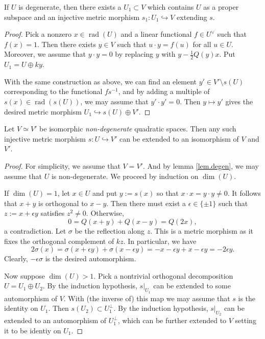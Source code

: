 \documentclass{article}
\newcommand{\rad}{\operatorname{rad}}
\begin{document}
\begin{lemma}\label{lem.degen}
    If $U$ is degenerate, then there exists a $U_1\subset V$ which contains $U$ as a proper subspace and an injective metric morphism $s_1:U_1\hookrightarrow V$ extending $s$.
\end{lemma}

\begin{proof}
    Pick a nonzero $x\in \rad(U)$ and a linear functional $f\in U^\vee$ such that $f(x)=1$. Then there exists $y\in V$ such that $u\cdot y=f(u)$ for all $u\in U$. Moreover, we assume that $y\cdot y=0$ by replacing $y$ with $y-\frac{1}{2}Q(y)x$. Put $U_1=U\oplus ky$.

    With the same construction as above, we can find an element $y'\in V'\setminus s(U)$ corresponding to the functional $fs^{-1}$, and by adding a multiple of $s(x)\in\rad(s(U))$, we may assume that $y'\cdot y'=0$. Then $y\mapsto y'$ gives the desired metric morphism $U_1\hookrightarrow s(U)\oplus V'$.
\end{proof}

\begin{theorem}[Witt]
    Let $V\simeq V'$ be isomorphic \emph{non-degenerate} quadratic spaces. Then any such injective metric morphism $s:U\hookrightarrow V'$ can be extended to an isomorphism of $V$ and $V'$.
\end{theorem}

\begin{proof}
    For simplicity, we assume that $V=V'$. And by lemma \ref{lem.degen}, we may assume that $U$ is non-degenerate. We proceed by induction on $\dim(U)$. 

    If $\dim(U)=1$, let $x\in U$ and put $y:=s(x)$ so that $x\cdot x=y\cdot y\neq 0$. It follows that $x+y$ is orthogonal to $x-y$. Then there must exist a $\epsilon\in\{\pm 1\}$ such that $z:=x+\epsilon y$ satisfies $z^2\neq 0$. Otherwise, 
    \[ 0=Q(x+y)+Q(x-y)=Q(2x), \]
    a contradiction. Let $\sigma$ be the reflection along $z$. This is a metric morphism as it fixes the orthogonal complement of $kz$. In particular, we have 
    \[ 2\sigma(x)=\sigma(x+\epsilon y)+\sigma(x-\epsilon y)=-x-\epsilon y+x-\epsilon y=-2\epsilon y. \]
    Clearly, $-\epsilon\sigma$ is the desired automorphism.

    Now suppose $\dim(U)>1$. Pick a nontrivial orthogonal decomposition $U=U_1\oplus U_2$. By the induction hypothesis, $\left.s\right\vert_{U_1}$ can be extended to some automorphism of $V$. With (the inverse of) this map we may assume that $s$ is the identity on $U_1$. Then $s(U_2)\subset U_1^\bot$. By the induction hypothesis, $\left.s\right\vert_{U_2}$ can be extended to an automorphism of $U_1^\bot$, which can be further extended to $V$ setting it to be identiy on $U_1$. 
\end{proof}
\end{document}
